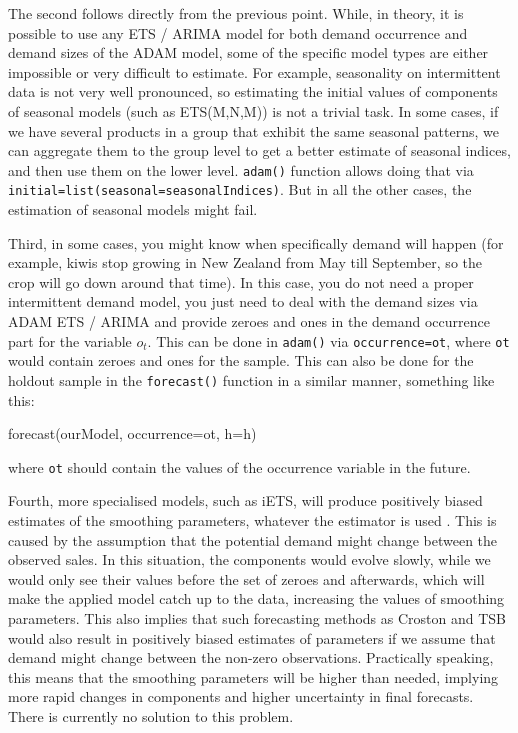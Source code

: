 \documentclass[
]{book}
\newenvironment{Shaded}{\begin{snugshade}}{\end{snugshade}}
\newcommand{\AttributeTok}[1]{\textcolor[rgb]{0.77,0.63,0.00}{#1}}
\newcommand{\FunctionTok}[1]{\textcolor[rgb]{0.00,0.00,0.00}{#1}}
\newcommand{\NormalTok}[1]{#1}
\theoremstyle{definition}
\theoremstyle{definition}
\theoremstyle{definition}
\theoremstyle{definition}
\theoremstyle{remark}
\begin{document}
The second follows directly from the previous point. While, in theory, it is possible to use any ETS / ARIMA model for both demand occurrence and demand sizes of the ADAM model, some of the specific model types are either impossible or very difficult to estimate. For example, seasonality on intermittent data is not very well pronounced, so estimating the initial values of components of seasonal models (such as ETS(M,N,M)) is not a trivial task. In some cases, if we have several products in a group that exhibit the same seasonal patterns, we can aggregate them to the group level to get a better estimate of seasonal indices, and then use them on the lower level. \texttt{adam()} function allows doing that via \texttt{initial=list(seasonal=seasonalIndices)}. But in all the other cases, the estimation of seasonal models might fail.

Third, in some cases, you might know when specifically demand will happen (for example, kiwis stop growing in New Zealand from May till September, so the crop will go down around that time). In this case, you do not need a proper intermittent demand model, you just need to deal with the demand sizes via ADAM ETS / ARIMA and provide zeroes and ones in the demand occurrence part for the variable \(o_t\). This can be done in \texttt{adam()} via \texttt{occurrence=ot}, where \texttt{ot} would contain zeroes and ones for the sample. This can also be done for the holdout sample in the \texttt{forecast()} function in a similar manner, something like this:

\begin{Shaded}
\begin{Highlighting}[]
\FunctionTok{forecast}\NormalTok{(ourModel, }\AttributeTok{occurrence=}\NormalTok{ot, }\AttributeTok{h=}\NormalTok{h)}
\end{Highlighting}
\end{Shaded}

where \texttt{ot} should contain the values of the occurrence variable in the future.

Fourth, more specialised models, such as iETS, will produce positively biased estimates of the smoothing parameters, whatever the estimator is used \citep[see explanation in][]{Svetunkov2019a}. This is caused by the assumption that the potential demand might change between the observed sales. In this situation, the components would evolve slowly, while we would only see their values before the set of zeroes and afterwards, which will make the applied model catch up to the data, increasing the values of smoothing parameters. This also implies that such forecasting methods as Croston \citep{Croston1972} and TSB \citep{Teunter2011} would also result in positively biased estimates of parameters if we assume that demand might change between the non-zero observations. Practically speaking, this means that the smoothing parameters will be higher than needed, implying more rapid changes in components and higher uncertainty in final forecasts. There is currently no solution to this problem.
\end{document}
